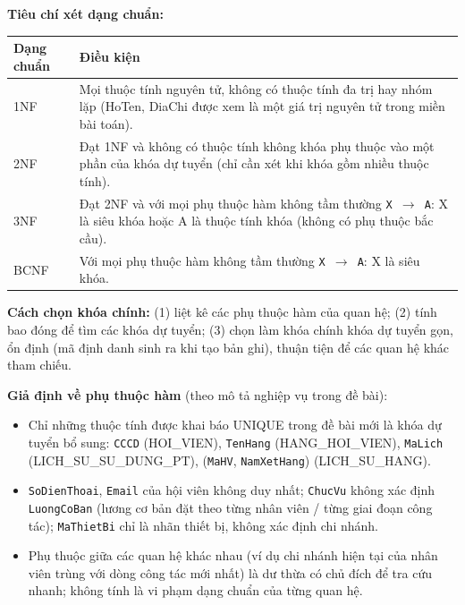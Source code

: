 \documentclass[11pt, a4paper]{article}
\begin{document}
\textbf{Tiêu chí xét dạng chuẩn:}

\vspace{0.5em}
\begin{small}
\begin{tabularx}{\textwidth}{| C{2.6cm} | Y |}
\hline
\textbf{Dạng chuẩn} & \textbf{Điều kiện} \\
\hline
1NF & Mọi thuộc tính nguyên tử, không có thuộc tính đa trị hay nhóm lặp (HoTen, DiaChi được xem là một giá trị nguyên tử trong miền bài toán). \\
\hline
2NF & Đạt 1NF và không có thuộc tính không khóa phụ thuộc vào một phần của khóa dự tuyển (chỉ cần xét khi khóa gồm nhiều thuộc tính). \\
\hline
3NF & Đạt 2NF và với mọi phụ thuộc hàm không tầm thường \texttt{X $\rightarrow$ A}: X là siêu khóa hoặc A là thuộc tính khóa (không có phụ thuộc bắc cầu). \\
\hline
BCNF & Với mọi phụ thuộc hàm không tầm thường \texttt{X $\rightarrow$ A}: X là siêu khóa. \\
\hline
\end{tabularx}
\end{small}

\vspace{0.5em}
\textbf{Cách chọn khóa chính:} (1) liệt kê các phụ thuộc hàm của quan hệ; (2) tính bao đóng để tìm các khóa dự tuyển; (3) chọn làm khóa chính khóa dự tuyển gọn, ổn định (mã định danh sinh ra khi tạo bản ghi), thuận tiện để các quan hệ khác tham chiếu.

\textbf{Giả định về phụ thuộc hàm} (theo mô tả nghiệp vụ trong đề bài):
\begin{itemize}
    \item Chỉ những thuộc tính được khai báo UNIQUE trong đề bài mới là khóa dự tuyển bổ sung: \texttt{CCCD} (HOI\_VIEN), \texttt{TenHang} (HANG\_HOI\_VIEN), \texttt{MaLich} (LICH\_SU\_SU\_DUNG\_PT), (\texttt{MaHV}, \texttt{NamXetHang}) (LICH\_SU\_HANG).
    \item \texttt{SoDienThoai}, \texttt{Email} của hội viên không duy nhất; \texttt{ChucVu} không xác định \texttt{LuongCoBan} (lương cơ bản đặt theo từng nhân viên / từng giai đoạn công tác); \texttt{MaThietBi} chỉ là nhãn thiết bị, không xác định chi nhánh.
    \item Phụ thuộc giữa các quan hệ khác nhau (ví dụ chi nhánh hiện tại của nhân viên trùng với dòng công tác mới nhất) là dư thừa có chủ đích để tra cứu nhanh; không tính là vi phạm dạng chuẩn của từng quan hệ.
\end{itemize}
\end{document}
